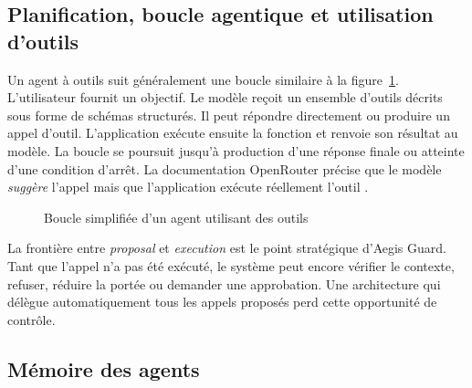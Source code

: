 \subsection{Planification, boucle agentique et utilisation d'outils}

Un agent à outils suit généralement une boucle similaire à la figure~\ref{fig:agent-loop}. L'utilisateur fournit un objectif. Le modèle reçoit un ensemble d'outils décrits sous forme de schémas structurés. Il peut répondre directement ou produire un appel d'outil. L'application exécute ensuite la fonction et renvoie son résultat au modèle. La boucle se poursuit jusqu'à production d'une réponse finale ou atteinte d'une condition d'arrêt. La documentation OpenRouter précise que le modèle \emph{suggère} l'appel mais que l'application exécute réellement l'outil \cite{openroutertools}.

\begin{figure}[H]
\centering
{}
\caption{Boucle simplifiée d'un agent utilisant des outils}
\label{fig:agent-loop}
\end{figure}

La frontière entre \textit{proposal} et \textit{execution} est le point stratégique d'Aegis Guard. Tant que l'appel n'a pas été exécuté, le système peut encore vérifier le contexte, refuser, réduire la portée ou demander une approbation. Une architecture qui délègue automatiquement tous les appels proposés perd cette opportunité de contrôle.

\subsection{Mémoire des agents}

